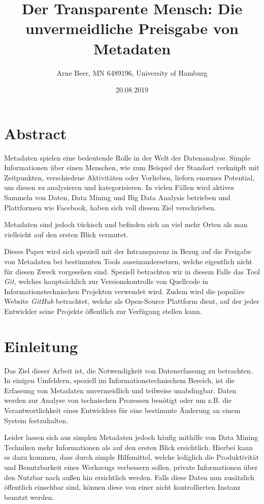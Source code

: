 \documentclass[12pt,a4paper]{article}
\begin{document}
\title{Der Transparente Mensch: Die unvermeidliche Preisgabe von Metadaten }
\author{Arne Beer, MN 6489196, University of Hamburg}
\date{20.08.2019}

\maketitle


\section{Abstract}

Metadaten spielen eine bedeutende Rolle in der Welt der Datenanalyse.
Simple Informationen über einen Menschen, wie zum Beispiel der Standort verknüpft mit Zeitpunkten, verschiedene Aktivitäten oder Vorlieben, liefern enormes Potential, um diesen zu analysieren und kategorisieren.
In vielen Fällen wird aktives Sammeln von Daten, Data Mining und Big Data Analysis betrieben und Plattformen wie Facebook, haben sich voll diesem Ziel verschrieben.

Metadaten sind jedoch tückisch und befinden sich an viel mehr Orten als man vielleicht auf den ersten Blick vermutet.

Dieses Paper wird sich speziell mit der Intransparenz in Bezug auf die Freigabe von Metadaten bei bestimmten Tools auseinandersetzen, welche eigentlich nicht für diesen Zweck vorgesehen sind.
Speziell betrachten wir in diesem Falle das Tool \emph{Git}, welches hauptsächlich zur Versionskontrolle von Quellcode in Informationstechnischen Projekten verwendet wird.
Zudem wird die populäre Website \emph{GitHub} betrachtet, welche als Open-Source Plattform dient, auf der jeder Entwickler seine Projekte öffentlich zur Verfügung stellen kann.

\newpage

\section{Einleitung}
Das Ziel dieser Arbeit ist, die Notwendigkeit von Datenerfassung zu betrachten.
In einigen Umfeldern, speziell im Informationstechnischem Bereich, ist die Erfassung von Metadaten unvermeidlich und teilweise unabdingbar.
Daten werden zur Analyse von technischen Prozessen benötigt oder um z.B. die Verantwortlichkeit eines Entwicklers für eine bestimmte Änderung an einem System festzuhalten.

Leider lassen sich aus simplen Metadaten jedoch häufig mithilfe von Data Mining Techniken mehr Informationen als auf den ersten Blick ersichtlich.
Hierbei kann es dazu kommen, dass durch simple Hilfsmittel, welche lediglich die Produktivität und Benutzbarkeit eines Werkzeugs verbessern sollen, private Informationen über den Nutzbar nach außen hin ersichtlich werden.
Falls diese Daten nun zusätzlich öffentlich einsehbar sind, können diese von einer nicht kontrollierten Instanz benutzt werden.
\end{document}
